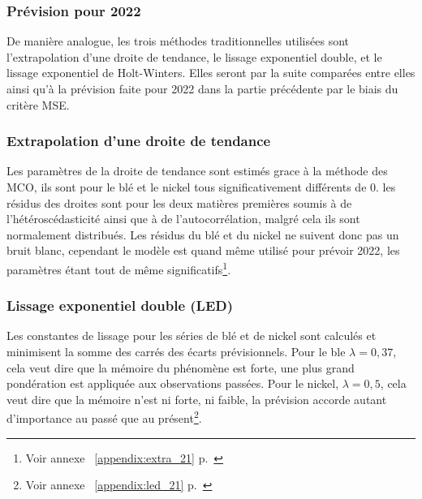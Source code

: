 \subsubsection{Prévision pour 2022}
De manière analogue, les trois méthodes traditionnelles utilisées sont l'extrapolation d'une droite de tendance, le lissage exponentiel double, et 
le lissage exponentiel de Holt-Winters. Elles seront par la suite comparées entre elles ainsi qu'à la prévision faite pour 2022 dans la partie précédente par le biais du 
critère MSE.
\subsubsection*{Extrapolation d'une droite de tendance}
Les paramètres de la droite de tendance sont estimés grace à la méthode des MCO, ils sont pour le blé et le nickel tous significativement différents de 0. 
les résidus des droites sont pour les deux matières premières soumis à de l'hétéroscédasticité ainsi que à de l'autocorrélation, malgré cela ils sont normalement 
distribués. Les résidus du blé et du nickel ne suivent donc pas un bruit blanc, cependant le modèle est quand même utilisé pour prévoir 2022, les paramètres étant 
tout de même significatifs\footnote{Voir annexe ~\ref{appendix:extra_21} p.~\pageref{appendix:extra_21}}.
\subsubsection*{Lissage exponentiel double (LED)}
Les constantes de lissage pour les séries de blé et de nickel sont calculés et minimisent la somme des carrés des écarts prévisionnels. Pour le ble $\lambda = 0,37$, cela 
veut dire que la mémoire du phénomène est forte, une plus grand pondération est appliquée aux observations passées. Pour le nickel, $\lambda = 0,5$, cela veut
dire que la mémoire n'est ni forte, ni faible, la prévision accorde autant d'importance au passé que au présent\footnote{Voir annexe ~\ref{appendix:led_21} 
p.~\pageref{appendix:led_21}}.
